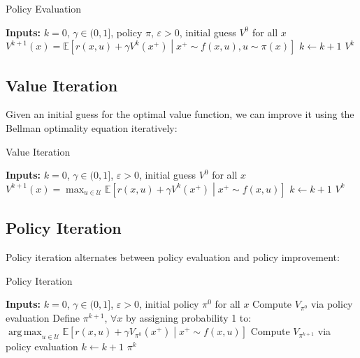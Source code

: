 \documentclass[openany]{book}
\DeclareMathOperator*{\argmax}{arg\,max}  %
\theoremstyle{definition}
\theoremstyle{remark}
\begin{document}
\begin{algorithm}[H]
\caption{Policy Evaluation}
\begin{algorithmic}[1]
\State \textbf{Inputs:} $k = 0$, $\gamma \in (0,1]$, policy $\pi$, $\varepsilon > 0$, initial guess $V^0$ for all $x$
\Repeat
        \State $V^{k+1}(x) = \mathbb{E}\left[r(x,u) + \gamma V^k(x^+) \middle| x^+ \sim f(x,u), u \sim \pi(x)\right]$
    \EndFor
    \State $k \leftarrow k + 1$
\State \Return $V^k$
\end{algorithmic}
\end{algorithm}

\subsection{Value Iteration}
Given an initial guess for the optimal value function, we can improve it using the Bellman optimality equation iteratively:

\begin{algorithm}[H]
\caption{Value Iteration}
\begin{algorithmic}[1]
\State \textbf{Inputs:} $k = 0$, $\gamma \in (0,1]$, $\varepsilon > 0$, initial guess $V^0$ for all $x$
\Repeat
        \State $V^{k+1}(x) = \max_{u\in\mathcal{U}} \mathbb{E}\left[r(x,u) + \gamma V^k(x^+) \middle| x^+ \sim f(x,u)\right]$
    \EndFor
    \State $k \leftarrow k + 1$
\State \Return $V^k$
\end{algorithmic}
\end{algorithm}

\subsection{Policy Iteration}
Policy iteration alternates between policy evaluation and policy improvement:

\begin{algorithm}[H]
\caption{Policy Iteration}
\begin{algorithmic}[1]
\State \textbf{Inputs:} $k = 0$, $\gamma \in (0,1]$, $\varepsilon > 0$, initial policy $\pi^0$ for all $x$
\State Compute $V_{\pi^0}$ via policy evaluation
\Repeat
    \State Define $\pi^{k+1}$, $\forall x$ by assigning probability 1 to:
    \State \quad $\argmax_{u\in\mathcal{U}} \mathbb{E}\left[r(x,u) + \gamma V_{\pi^k}(x^+) \middle| x^+ \sim f(x,u)\right]$
    \State Compute $V_{\pi^{k+1}}$ via policy evaluation
    \State $k \leftarrow k + 1$
\State \Return $\pi^k$
\end{algorithmic}
\end{algorithm}
\end{document}
